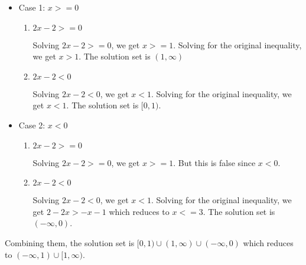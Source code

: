 \documentclass{article}
\begin{document}
\begin{itemize}
\item Case 1: $x >= 0$

  \begin{enumerate}
  \item $2x - 2 >= 0$

    Solving $2x - 2 >= 0$, we get $x >= 1$. Solving for the original
    inequality, we get $ x > 1$. The solution set is $(1, \infty)$
    
  \item $2x - 2 < 0$

    Solving $2x - 2 < 0$, we get $x < 1$. Solving for the original
    inequality, we get $x < 1$. The solution set is $[0, 1)$.
  \end{enumerate}

\item Case 2: $x < 0$

  \begin{enumerate}
  \item $2x - 2 >= 0$

    Solving $2x - 2 >= 0$, we get $x >= 1$. But this is false since
    $x < 0$.
    
  \item $2x - 2 < 0$

    Solving $2x - 2 < 0$, we get $x < 1$. Solving for the original
    inequality, we get $2 - 2x > -x - 1$ which reduces to $x <= 3$.
    The solution set is $(-\infty, 0)$.
  \end{enumerate}

\end{itemize}

Combining them, the solution set is
$[0, 1) \cup (1, \infty) \cup (-\infty, 0)$ which reduces to
$(-\infty, 1) \cup [1, \infty)$.
\end{document}
